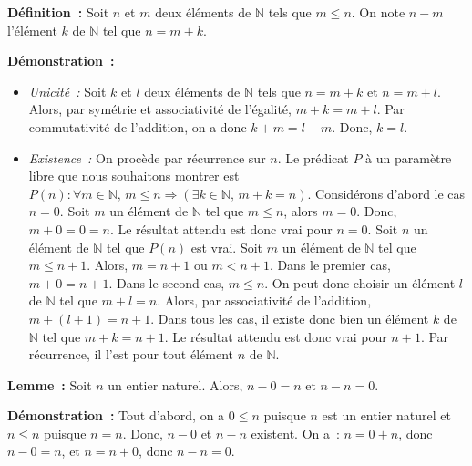 \medskip

\noindent\textbf{Définition :} Soit $n$ et $m$ deux éléments de $\mathbb{N}$ tels que $m \leq n$. 
    On note $n-m$ l'élément $k$ de $\mathbb{N}$ tel que $n = m  + k$.
     \sindex[isy]{$-$}

\medskip

\noindent\textbf{Démonstration :} 
    \begin{itemize}[nosep]
        \item \textit{Unicité :}
            Soit $k$ et $l$ deux éléments de $\mathbb{N}$ tels que $n = m + k$ et $n = m + l$.
            Alors, par symétrie et associativité de l'égalité, $m + k = m + l$. 
            Par commutativité de l'addition, on a donc $k + m = l + m$.
            Donc, $k = l$.
        \item \textit{Existence :}
            On procède par récurrence sur $n$. 
            Le prédicat $P$ à un paramètre libre que nous souhaitons montrer est $P(n): \forall m \in \mathbb{N}, \, m \leq n \Rightarrow (\exists k \in \mathbb{N}, \, m+k=n)$.
            Considérons d'abord le cas $n=0$. 
            Soit $m$ un élément de $\mathbb{N}$ tel que $m \leq n$, alors $m=0$. 
            Donc, $m+0 = 0 = n$. 
            Le résultat attendu est donc vrai pour $n=0$.
            Soit $n$ un élément de $\mathbb{N}$ tel que $P(n)$ est vrai. 
            Soit $m$ un élément de $\mathbb{N}$ tel que $m \leq n+1$. 
            Alors, $m = n+1$ ou $m < n+1$. 
            Dans le premier cas, $m+0=n+1$. 
            Dans le second cas, $m \leq n$. 
            On peut donc choisir un élément $l$ de $\mathbb{N}$ tel que $m+l=n$. 
            Alors, par associativité de l'addition, $m+(l+1)=n+1$. 
            Dans tous les cas, il existe donc bien un élément $k$ de $\mathbb{N}$ tel que $m+k=n+1$.
            Le résultat attendu est donc vrai pour $n+1$. 
            Par récurrence, il l'est pour tout élément $n$ de $\mathbb{N}$.
    \end{itemize}

   \done 

\medskip

\noindent\textbf{Lemme :} Soit $n$ un entier naturel. Alors, $n - 0 = n$ et $n - n = 0$. 

\medskip

\noindent\textbf{Démonstration :} Tout d'abord, on a $0 \leq n$ puisque $n$ est un entier naturel et $n \leq n$ puisque $n = n$. 
    Donc, $n - 0$ et $n - n$ existent.
    On a : $n = 0 + n$, donc $n - 0 = n$, et $n = n + 0$, donc $n - n = 0$.

